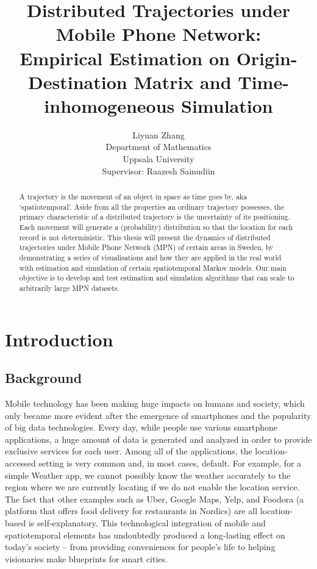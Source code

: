 \documentclass[12pt]{article}
\title{\Large Distributed Trajectories under Mobile Phone Network: \\Empirical Estimation on Origin-Destination Matrix and Time-inhomogeneous Simulation}
\author{Liyuan Zhang\\[2cm]{\large Department of Mathematics}\\[0.2cm]{\large Uppsala University}\\[2cm]{\large Supervisor: Raazesh Sainudiin}}
\theoremstyle{definition}
\begin{document}
\maketitle\newpage


\tableofcontents\newpage




\begin{abstract}
  A trajectory is the movement of an object in space as time goes by, aka ‘spatiotemporal’. Aside from all the properties an ordinary trajectory possesses, the primary characteristic of a distributed trajectory is the uncertainty of its positioning. Each movement will generate a (probability) distribution so that the location for each record is not deterministic. This thesis will present the dynamics of distributed trajectories under Mobile Phone Network (MPN) of certain areas in Sweden, by demonstrating a series of visualisations and how they are applied in the real world with estimation and simulation of certain spatiotemporal Markov models. Our main objective is to develop and test estimation and simulation algorithms that can scale to arbitrarily large MPN datasets.
\end{abstract}

\section{Introduction}
\subsection{Background}
Mobile technology has been making huge impacts on humans and society, which only became more evident after the emergence of smartphones and the popularity of big data technologies. Every day, while people use various smartphone applications, a huge amount of data is generated and analyzed in order to provide exclusive services for each user. Among all of the applications, the location-accessed setting is very common and, in most cases, default. For example, for a simple Weather app, we cannot possibly know the weather accurately to the region where we are currently locating if we do not enable the location service. The fact that other examples such as Uber, Google Maps, Yelp, and Foodora (a platform that offers food delivery for restaurants in Nordics) are all location-based is self-explanatory. This technological integration of mobile and spatiotemporal elements has undoubtedly produced a long-lasting effect on today’s society -- from providing conveniences for people’s life to helping visionaries make blueprints for smart cities. 
\end{document}
